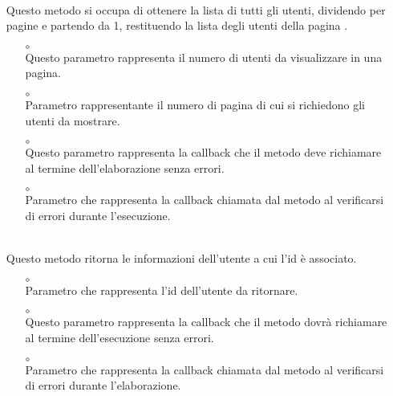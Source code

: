 \begin{itemize}
\begin{itemize}
\end{itemize}
\item[]  \\ Questo metodo si occupa di ottenere la lista di tutti gli utenti, dividendo per pagine e partendo da 1, restituendo la lista degli  utenti della pagina .
\begin{itemize}\addtolength{\itemsep}{-0.5\baselineskip}
\item[$\circ$]  \\ Questo parametro rappresenta il numero di utenti da visualizzare in una pagina.
\item[$\circ$]  \\ Parametro rappresentante il numero di pagina di cui si richiedono gli utenti da mostrare.
\item[$\circ$]  \\ Questo parametro rappresenta la callback che il metodo deve richiamare al termine dell'elaborazione senza errori.
\item[$\circ$]  \\ Parametro che rappresenta la callback chiamata dal metodo al verificarsi di errori durante l'esecuzione.
\end{itemize}
\item[]  \\ Questo metodo ritorna le informazioni dell'utente a cui l'id è associato.
\begin{itemize}\addtolength{\itemsep}{-0.5\baselineskip}
\item[$\circ$]  \\ Parametro che rappresenta l'id dell'utente da ritornare.
\item[$\circ$]  \\ Questo parametro rappresenta la callback che il metodo dovrà richiamare al termine dell'esecuzione senza errori.
\item[$\circ$]  \\ Parametro che rappresenta la callback chiamata dal metodo al verificarsi di errori durante l'elaborazione.
\end{itemize}

\end{itemize}
